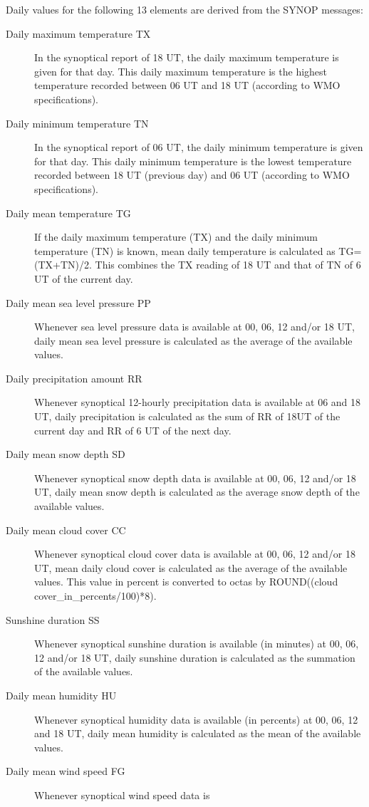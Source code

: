 \documentclass[a4paper,11pt]{article}
\begin{document}
Daily values for the following 13 elements are derived from the SYNOP
messages:

\begin{description}
\item[Daily maximum temperature TX] In the synoptical report of 18
UT, the daily maximum temperature is given for that day. This daily
maximum temperature is the highest temperature recorded between 06 UT
and 18 UT (according to WMO specifications).
\item[Daily minimum temperature TN] In the synoptical report of 06 UT,
the daily minimum temperature is given for that day. This daily
minimum temperature is the lowest temperature recorded between 18 UT
(previous day) and 06 UT (according to WMO specifications).
\item[Daily mean temperature TG] If the daily maximum temperature (TX)
and the daily minimum temperature (TN) is known, mean daily
temperature is calculated as TG=(TX+TN)/2. This combines the TX reading 
of 18 UT and that of TN of 6 UT of the current day.
\item[Daily mean sea level pressure PP] Whenever sea level pressure
data is available at 00, 06, 12 and/or 18 UT, daily mean sea level
pressure is calculated as the average of the available values.
\item[Daily precipitation amount RR] Whenever synoptical 12-hourly
precipitation data is available at 06 and 18 UT, daily precipitation
is calculated as the sum of RR of 18UT of the current day and RR of 
6 UT of the next day.
\item[Daily mean snow depth SD] Whenever synoptical snow depth data is
available at 00, 06, 12 and/or 18 UT, daily mean snow depth is calculated
as the average snow depth of the available values.
\item[Daily mean cloud cover CC] Whenever synoptical cloud cover data
is available at 00, 06, 12 and/or 18 UT, mean daily cloud cover is
calculated as the average of the available values. This value in
percent is converted to octas by ROUND((cloud
cover\_in\_percents/100)*8).
\item[Sunshine duration SS] Whenever synoptical sunshine duration is
available (in minutes) at 00, 06, 12 and/or 18 UT, daily sunshine
duration is calculated as the summation of the available values.
\item[Daily mean humidity HU] Whenever synoptical humidity data is
available (in percents) at 00, 06, 12 and 18 UT, daily mean humidity is
calculated as the mean of the available values.
\item[Daily mean wind speed FG] Whenever synoptical wind speed data is

\end{description}
\end{document}
